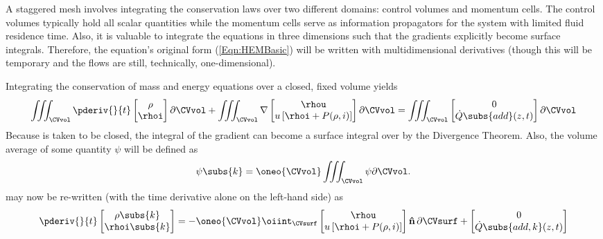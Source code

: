 A staggered mesh involves integrating the conservation laws over two different domains: control volumes and momentum cells.
The control volumes typically hold all scalar quantities while the momentum cells serve as information propagators for the system with limited fluid residence time.
Also, it is valuable to integrate the equations in three dimensions such that the gradients explicitly become surface integrals.
Therefore, the equation's original form (\cref{Eqn:HEMBasic}) will be written with multidimensional derivatives (though this will be temporary and the flows are still, technically, one-dimensional).

Integrating the conservation of mass and energy equations over a closed, fixed volume \CVvol yields
\begin{equation}
    \iiint_{\CVvol}\pderiv{}{t}\begin{bmatrix}
                   \rho \\
                   \rhoi 
                \end{bmatrix}\partial\CVvol
    + 
    \iiint_{\CVvol}\mathbf{\nabla}\begin{bmatrix}
                    \rhou                 \\
                    u\left[\rhoi  + P(\rho,i)\right]
                \end{bmatrix}\partial\CVvol
             =  
    \iiint_{\CVvol}\begin{bmatrix}
        0 \\%
        \dot{Q}\subs{add}(z,t)
    \end{bmatrix}\partial\CVvol
    \label{Eqn:HEMBasic3D}
\end{equation}
Because \CVvol is taken to be closed, the integral of the gradient can become a surface integral over \CVsurf by the Divergence Theorem.
Also, the volume average of some quantity $\psi$ will be defined as
\begin{equation}
    \psi\subs{k} = \oneo{\CVvol}\iiint_{\CVvol}\psi \partial\CVvol.
    \label{Eqn:VolumeAveragedQuantity}
\end{equation}
 may now be re-written (with the time derivative alone on the left-hand side) as 
\begin{equation}
                \pderiv{}{t}\begin{bmatrix}
                   \rho\subs{k} \\
                   \rhoi\subs{k} 
                \end{bmatrix}
    = -  
    \oneo{\CVvol}
                \oiint_{\CVsurf}\begin{bmatrix}
                    \rhou                 \\
                    u\left[\rhoi  + P(\rho,i)\right]
                \end{bmatrix} \mathbf{\hat{n}}\,\partial\CVsurf
             +  
    \begin{bmatrix}
        0 \\%
        \dot{Q}\subs{add,k}(z,t)
    \end{bmatrix}
    \label{Eqn:HEMFVM1}
\end{equation}
